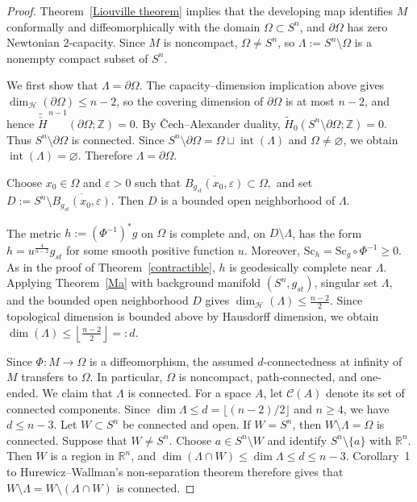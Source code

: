 \documentclass[12pt,oneside,a4paper]{article}
\theoremstyle{mytheorem}
\theoremstyle{remark}
\theoremstyle{definition}
\begin{document}
\begin{proof}
Theorem~\ref{Liouville theorem} implies that the developing map identifies
\(M\) conformally and diffeomorphically with the domain \(\Omega\subset S^n\),
and \(\partial\Omega\) has zero Newtonian \(2\)-capacity.
Since \(M\) is noncompact, \(\Omega\neq S^n\), so
\(\Lambda:=S^n\setminus\Omega\) is a nonempty compact subset of \(S^n\).

We first show that \(\Lambda=\partial\Omega\). The capacity--dimension
implication above gives
\(\dim_{\mathcal H}(\partial\Omega)\leq n-2\), so the covering dimension of
\(\partial\Omega\) is at most \(n-2\), and hence
\(\widetilde{\check H}^{\,n-1}(\partial\Omega;\mathbb Z)=0.\) By
\v{C}ech--Alexander duality,
\(\widetilde H_0(S^n\setminus\partial\Omega;\mathbb Z)=0.\) Thus
\(S^n\setminus\partial\Omega\) is connected. Since
\(S^n\setminus\partial\Omega =\Omega\sqcup\operatorname{int}(\Lambda)\)
and \(\Omega\neq\varnothing\), we obtain
\(\operatorname{int}(\Lambda)=\varnothing\). Therefore
\(\Lambda=\partial\Omega\).

Choose \(x_0\in\Omega\) and \(\varepsilon>0\) such that
\(\overline{B_{g_{st}}(x_0,\varepsilon)}\subset\Omega,\) and set
\(D:=S^n\setminus\overline{B_{g_{st}}(x_0,\varepsilon)}.\)
Then \(D\) is a bounded open neighborhood of \(\Lambda\).

The metric \(h:=(\Phi^{-1})^*g\) on \(\Omega\) is complete and, on
\(D\setminus\Lambda\), has the form \(h=u^{\frac{4}{n-2}}g_{st}\) for some
smooth positive function \(u\). Moreover,
\(\mathrm{Sc}_h=\mathrm{Sc}_g\circ\Phi^{-1}\geq0.\)
As in the proof of Theorem~\ref{contractible}, \(h\) is geodesically complete
near \(\Lambda\). Applying Theorem~\ref{Ma} with background manifold
\((S^n,g_{st})\), singular set \(\Lambda\), and the bounded open
neighborhood \(D\) gives
\(\dim_{\mathcal H}(\Lambda)\leq\frac{n-2}{2}\).
Since topological dimension is bounded above by Hausdorff dimension, we obtain
\(\dim(\Lambda)\leq\left\lfloor\frac{n-2}{2}\right\rfloor=:d\).

Since \(\Phi\colon M\to\Omega\) is a diffeomorphism, the assumed
\(d\)-connectedness at infinity of \(M\) transfers to \(\Omega\). In
particular, \(\Omega\) is noncompact, path-connected, and one-ended. We claim
that \(\Lambda\) is connected. For a space \(A\), let \(\mathcal C(A)\) denote
its set of connected components. Since
\(\dim\Lambda\leq d=\lfloor(n-2)/2\rfloor\) and \(n\geq4\),
we have \(d\leq n-3\). Let \(W\subset S^n\) be connected and open. If
\(W=S^n\), then \(W\setminus\Lambda=\Omega\) is connected. Suppose that
\(W\neq S^n\). Choose \(a\in S^n\setminus W\) and identify
\(S^n\setminus\{a\}\) with \(\mathbb R^n\). Then \(W\) is a region in
\(\mathbb R^n\), and
\(\dim(\Lambda\cap W)\leq\dim\Lambda\leq d\leq n-3\).
Corollary~1 to Hurewicz--Wallman's non-separation theorem
\cite[p.~48, Corollary~1 to Theorem~IV.4]{MR0006493} therefore gives that
\(W\setminus\Lambda=W\setminus(\Lambda\cap W)\)
is connected.


\end{proof}
\end{document}

